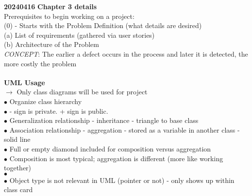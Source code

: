 \documentclass[11pt]{article}
\begin{document}
    \textbf{20240416}
    \textbf{Chapter 3 details}\\
    Prerequisites to begin working on a project:\\
    (0) - Starts with the Problem Definition (what details are desired)\\
    (a) List of requirements (gathered via user stories)\\
    (b) Architecture of the Problem\\
    

    \textit{CONCEPT}: The earlier a defect occurs in the process and later 
    it is detected, the more costly the problem\\
    \\
    \textbf{UML Usage}\\
    $\rightarrow$ Only class diagrams will be used for project\\
    \indent $\bullet$ Organize class hierarchy\\
    \indent $\bullet$ - sign is private. + sign is public.  \\
    \indent $\bullet$ Generalization relationship - inheritance - triangle to base class  \\
    \indent $\bullet$ Association relationship - aggregation - stored as a variable in another class - solid line  \\
    \indent\indent$\bullet$ Full or empty diamond included for composition versus aggregation \\
    \indent\indent$\bullet$ Composition is most typical; aggregation is different (more like working together)\\
    \indent $\bullet$   \\
    \indent $\bullet$ Object type is not relevant in UML (pointer or not) - only shows up within class card  \\
\end{document}
